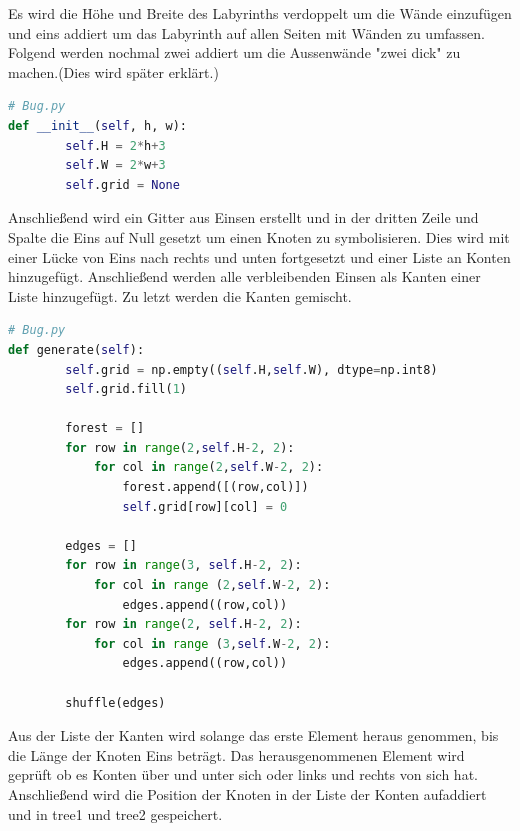 \documentclass[12pt, a4paper, titlepage]{article}
\begin{document}
Es wird die Höhe und Breite des Labyrinths verdoppelt um die Wände einzufügen und eins addiert um das Labyrinth auf allen Seiten mit Wänden zu umfassen.
Folgend werden nochmal zwei addiert um die Aussenwände "zwei dick" zu machen.(Dies wird später erklärt.)
\begin{lstlisting}[language = Python]
# Bug.py
def __init__(self, h, w):
        self.H = 2*h+3
        self.W = 2*w+3
        self.grid = None
\end{lstlisting}

Anschließend wird ein Gitter aus Einsen erstellt und in der dritten Zeile und Spalte die Eins auf Null gesetzt um einen Knoten zu symbolisieren.
Dies wird mit einer Lücke von Eins nach rechts und unten fortgesetzt und einer Liste an Konten hinzugefügt.
Anschließend werden alle verbleibenden Einsen als Kanten einer Liste hinzugefügt.
Zu letzt werden die Kanten gemischt.

\begin{lstlisting}[language = Python]
# Bug.py
def generate(self):
        self.grid = np.empty((self.H,self.W), dtype=np.int8)
        self.grid.fill(1)
        
        forest = []
        for row in range(2,self.H-2, 2):
            for col in range(2,self.W-2, 2):
                forest.append([(row,col)])
                self.grid[row][col] = 0
        
        edges = []
        for row in range(3, self.H-2, 2):
            for col in range (2,self.W-2, 2):
                edges.append((row,col))
        for row in range(2, self.H-2, 2):
            for col in range (3,self.W-2, 2):
                edges.append((row,col))
        
        shuffle(edges)
\end{lstlisting}

Aus der Liste der Kanten wird solange das erste Element heraus genommen, bis die Länge der Knoten Eins beträgt.
Das herausgenommenen Element wird geprüft ob es Konten über und unter sich oder links und rechts von sich hat.
Anschließend wird die Position der Knoten in der Liste der Konten aufaddiert und in tree1 und tree2 gespeichert.
\end{document}
